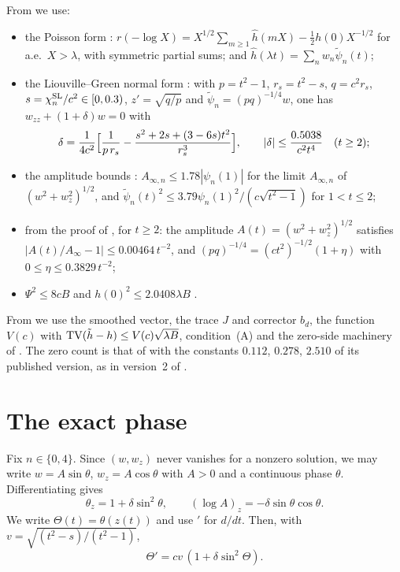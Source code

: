\documentclass[11pt]{amsart}
\theoremstyle{remark}
\numberwithin{equation}{section}
\begin{document}
From \cite{MoriWeilII} we use:
\begin{itemize}
\item the Poisson form \cite[Lemma~2.3]{MoriWeilII}: $r(-\log X)=X^{1/2}\sum_{m\ge1}\hat h(mX)-\frac12h(0)X^{-1/2}$ for a.e.\ $X>\lambda$, with symmetric partial sums; and $\hat h(\lambda t)=\sum_nw_n\tilde\psi_n(t)$;
\item the Liouville--Green normal form \cite[Lemma~3.2]{MoriWeilII}: with $p=t^2-1$, $r_s=t^2-s$, $q=c^2r_s$, $s=\chi^{\rm SL}_n/c^2\in[0,0.3)$, $z'=\sqrt{q/p}$ and $\tilde\psi_n=(pq)^{-1/4}w$, one has $w_{zz}+(1+\delta)w=0$ with
\[
\delta=\frac1{4c^2}\Bigl[\frac1{p\,r_s}-\frac{s^2+2s+(3-6s)t^2}{r_s^3}\Bigr],\qquad |\delta|\le\frac{0.5038}{c^2t^4}\quad(t\ge2);
\]
\item the amplitude bounds \cite[Lemma~3.5]{MoriWeilII}: $A_{\infty,n}\le1.78|\psi_n(1)|$ for the limit $A_{\infty,n}$ of $(w^2+w_z^2)^{1/2}$, and $\tilde\psi_n(t)^2\le3.79\psi_n(1)^2/(c\sqrt{t^2-1})$ for $1<t\le2$;
\item from the proof of \cite[Lemma~3.6]{MoriWeilII}, for $t\ge2$: the amplitude $A(t)=(w^2+w_z^2)^{1/2}$ satisfies $|A(t)/A_\infty-1|\le0.00464\,t^{-2}$, and $(pq)^{-1/4}=(ct^2)^{-1/2}(1+\eta)$ with $0\le\eta\le0.3829\,t^{-2}$;
\item $\Psi^2\le8cB$ \cite[Lemma~3.3]{MoriWeilII} and $h(0)^2\le2.0408\lambda B$ \cite[Lemma~3.4]{MoriWeilII}.
\end{itemize}
From \cite{MoriWeilIII} we use the smoothed vector, the trace $J$ and corrector $b_d$, the function $V(c)$ with ${\rm TV}(\tilde h-h)\le V(c)\sqrt{\lambda B}$, condition~(A) and the zero-side machinery of \cite[Sections~2--6 and Appendix~A]{MoriWeilIII}. The zero count is that of \cite[Cor.~1]{Trudgian14} with the constants $0.112$, $0.278$, $2.510$ of its published version, as in version~2 of \cite{MoriWeilII,MoriWeilIII}.

\section{The exact phase}\label{sec:phase}

Fix $n\in\{0,4\}$. Since $(w,w_z)$ never vanishes for a nonzero solution, we may write $w=A\sin\theta$, $w_z=A\cos\theta$ with $A>0$ and a continuous phase $\theta$. Differentiating gives
\begin{equation}\label{eq:prufer}
\theta_z=1+\delta\sin^2\theta,\qquad (\log A)_z=-\delta\sin\theta\cos\theta .
\end{equation}
We write $\Theta(t)=\theta(z(t))$ and use $'$ for $d/dt$. Then, with $v=\sqrt{(t^2-s)/(t^2-1)}$,
\begin{equation}\label{eq:Theta}
\Theta'=cv\,(1+\delta\sin^2\Theta).
\end{equation}
\end{document}
